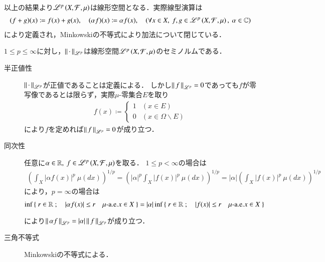 以上の結果より$\mathscr{L}^{p} \left(X,\mathcal{F},\mu\right)$は線形空間となる．実際線型演算は
\begin{align}
	(f+g)(x) \coloneqq f(x) + g(x), \quad (\alpha f)(x) \coloneqq \alpha f(x), \quad (\forall x \in X,\ f,g \in \semiLp{p}{X,\mathcal{F},\mu},\ \alpha \in \C)
\end{align}
により定義され，Minkowskiの不等式により加法について閉じている．

\begin{screen}
	\begin{lem}
		$1 \leq p \leq \infty$に対し，$\left\|\, \cdot\, \right\|_{\mathscr{L}^p}$は線形空間$\mathscr{L}^{p} \left(X,\mathcal{F},\mu\right)$のセミノルムである．
	\end{lem}
\end{screen}

\begin{prf}\mbox{}
	\begin{description}
	\item[半正値性] $\left\|\, \cdot\, \right\|_{\mathscr{L}^p}$が正値であることは定義による．
		しかし$\left\|\, f\, \right\|_{\mathscr{L}^p} = 0$であっても$f$が零写像であるとは限らず，実際$\mu$-零集合$E$を取り
		\begin{align}
			f(x) \coloneqq
			\begin{cases}
				1 & (x \in E) \\
				0 & (x \in \Omega \backslash E)
			\end{cases}
		\end{align}
		により$f$を定めれば$\left\|\, f\, \right\|_{\mathscr{L}^p} = 0$が成り立つ．
		
	\item[同次性] 
		任意に$\alpha \in \mathbb{R},\ f \in \mathscr{L}^{p} \left(X,\mathcal{F},\mu\right)$を取る．
		$1 \leq p < \infty$の場合は
		\begin{align}
			\left( \int_{X} |\alpha f(x)|^p\ \mu(dx) \right)^{1/p} = \left( |\alpha|^p \int_{X} |f(x)|^p\ \mu(dx) \right)^{1/p} 
			= |\alpha| \left( \int_{X} |f(x)|^p\ \mu(dx) \right)^{1/p}
		\end{align}
		により，$p = \infty$の場合は
		\begin{align}
			\operatorname*{inf}_{} \left\{\ r \in \mathbb{R}\ ;\quad |\alpha f(x)| \leq r \quad \mbox{$\mu$-a.e.}x \in X\ \right\} = |\alpha|\operatorname*{inf}_{} \left\{\ r \in \mathbb{R}\ ;\quad |f(x)|  \leq r \quad \mbox{$\mu$-a.e.}x \in X\ \right\}
		\end{align}
		により$\left\|\, \alpha f\, \right\|_{\mathscr{L}^p} = |\alpha|\left\|\, f\, \right\|_{\mathscr{L}^p}$が成り立つ．
		
	\item[三角不等式] Minkowskiの不等式による．
	\QED
	\end{description}
\end{prf}

